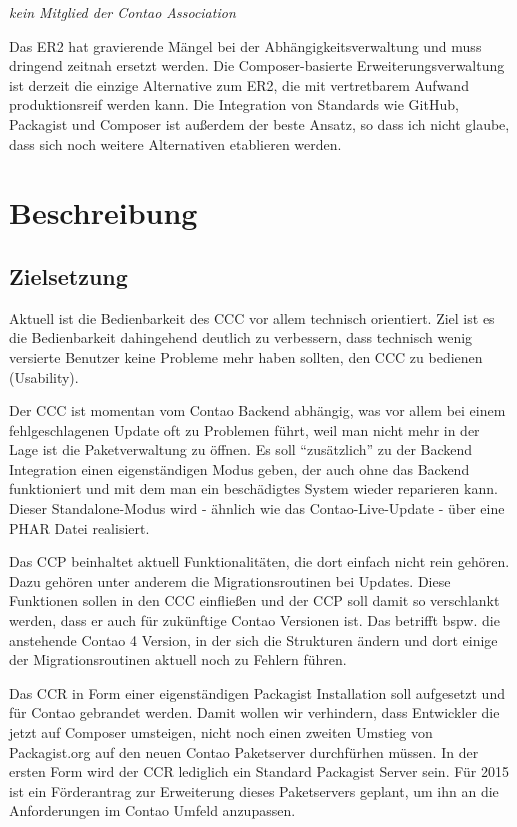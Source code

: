 \documentclass[
paper=a4,
draft=false,%
fontsize=10pt%
]{scrartcl}
\begin{document}
\emph{kein Mitglied der Contao Association}

Das ER2 hat gravierende Mängel bei der Abhängigkeitsverwaltung und muss dringend zeitnah ersetzt werden. Die Composer-basierte Erweiterungsverwaltung ist derzeit die einzige Alternative zum ER2, die mit vertretbarem Aufwand produktionsreif werden kann. Die Integration von Standards wie GitHub, Packagist und Composer ist außerdem der beste Ansatz, so dass ich nicht glaube, dass sich noch weitere Alternativen etablieren werden.

%
%

\newpage

\section{Beschreibung}

\subsection{Zielsetzung}

Aktuell ist die Bedienbarkeit des CCC vor allem technisch orientiert. Ziel ist es die Bedienbarkeit dahingehend deutlich zu verbessern, dass technisch wenig versierte Benutzer keine Probleme mehr haben sollten, den CCC zu bedienen (Usability).

Der CCC ist momentan vom Contao Backend abhängig, was vor allem bei einem fehlgeschlagenen Update oft zu Problemen führt, weil man nicht mehr in der Lage ist die Paketverwaltung zu öffnen. Es soll “zusätzlich” zu der Backend Integration einen eigenständigen Modus geben, der auch ohne das Backend funktioniert und mit dem man ein beschädigtes System wieder reparieren kann. Dieser Standalone-Modus wird - ähnlich wie das Contao-Live-Update - über eine PHAR Datei realisiert.

Das CCP beinhaltet aktuell Funktionalitäten, die dort einfach nicht rein gehören. Dazu gehören unter anderem die Migrationsroutinen bei Updates. Diese Funktionen sollen in den CCC einfließen und der CCP soll damit so verschlankt werden, dass er auch für zukünftige Contao Versionen ist. Das betrifft bspw. die anstehende Contao 4 Version, in der sich die Strukturen ändern und dort einige der Migrationsroutinen aktuell noch zu Fehlern führen.

Das CCR in Form einer eigenständigen Packagist Installation soll aufgesetzt und für Contao gebrandet werden. Damit wollen wir verhindern, dass Entwickler die jetzt auf Composer umsteigen, nicht noch einen zweiten Umstieg von Packagist.org auf den neuen Contao Paketserver durchfürhen müssen. In der ersten Form wird der CCR lediglich ein Standard Packagist Server sein. Für 2015 ist ein Förderantrag zur Erweiterung dieses Paketservers geplant, um ihn an die Anforderungen im Contao Umfeld anzupassen.
\end{document}
